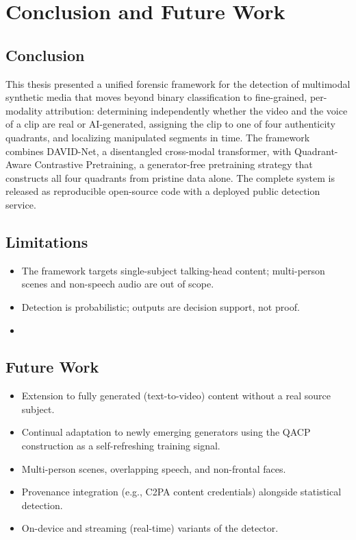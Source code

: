 \chapter{Conclusion and Future Work}
\label{ch:conclusion}

\section{Conclusion}
This thesis presented a unified forensic framework for the detection of
multimodal synthetic media that moves beyond binary classification to
fine-grained, per-modality attribution: determining independently whether the
video and the voice of a clip are real or AI-generated, assigning the clip to one
of four authenticity quadrants, and localizing manipulated segments in time. The
framework combines DAVID-Net, a disentangled cross-modal transformer, with
Quadrant-Aware Contrastive Pretraining, a generator-free pretraining strategy
that constructs all four quadrants from pristine data alone.
 The complete
system is released as reproducible open-source code with a deployed public
detection service.

\section{Limitations}
\begin{itemize}
  \item The framework targets single-subject talking-head content; multi-person
        scenes and non-speech audio are out of scope.
  \item Detection is probabilistic; outputs are decision support, not proof.
  \item {}
\end{itemize}

\section{Future Work}
\begin{itemize}
  \item Extension to fully generated (text-to-video) content without a real
        source subject.
  \item Continual adaptation to newly emerging generators using the QACP
        construction as a self-refreshing training signal.
  \item Multi-person scenes, overlapping speech, and non-frontal faces.
  \item Provenance integration (e.g., C2PA content credentials) alongside
        statistical detection.
  \item On-device and streaming (real-time) variants of the detector.
\end{itemize}
